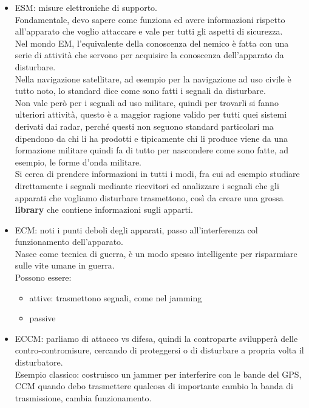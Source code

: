 \documentclass[oneside, 12pt]{extbook}
\begin{document}
\begin{itemize}
	\item ESM: misure elettroniche di supporto.
	\\Fondamentale, devo sapere come funziona ed avere informazioni rispetto all'apparato che voglio attaccare e vale per tutti gli aspetti di sicurezza.
	\\Nel mondo EM, l'equivalente della conoscenza del nemico è fatta con una serie di attività che servono per acquisire la conoscenza dell'apparato da disturbare.
	\\Nella navigazione satellitare, ad esempio per la navigazione ad uso civile è tutto noto, lo standard dice come sono fatti i segnali da disturbare.
	\\Non vale però per i segnali ad uso militare, quindi per trovarli si fanno ulteriori attività, questo è a maggior ragione valido per tutti quei sistemi derivati dai radar, perché questi non seguono standard particolari ma dipendono da chi li ha prodotti e tipicamente chi li produce viene da una formazione militare quindi fa di tutto per nascondere come sono fatte, ad esempio, le forme d'onda militare.
	\\Si cerca di prendere informazioni in tutti i modi, fra cui ad esempio studiare direttamente i segnali mediante ricevitori ed analizzare i segnali che gli apparati che vogliamo disturbare trasmettono, così da creare una grossa \textbf{library} che contiene informazioni sugli apparti.
	\item ECM: noti i punti deboli degli apparati, passo all'interferenza col funzionamento dell'apparato.
	\\Nasce come tecnica di guerra, è un modo spesso intelligente per risparmiare sulle vite umane in guerra.
	\\Possono essere:
	\begin{itemize}
		\item attive: trasmettono segnali, come nel jamming
		\item passive
	\end{itemize}
	\item ECCM: parliamo di attacco vs difesa, quindi la controparte svilupperà delle contro-contromisure, cercando di proteggersi o di disturbare a propria volta il disturbatore.
	\\Esempio classico: costruisco un jammer per interferire con le bande del GPS, CCM quando debo trasmettere qualcosa di importante cambio la banda di trasmissione, cambia funzionamento.
\end{itemize}
\end{document}
